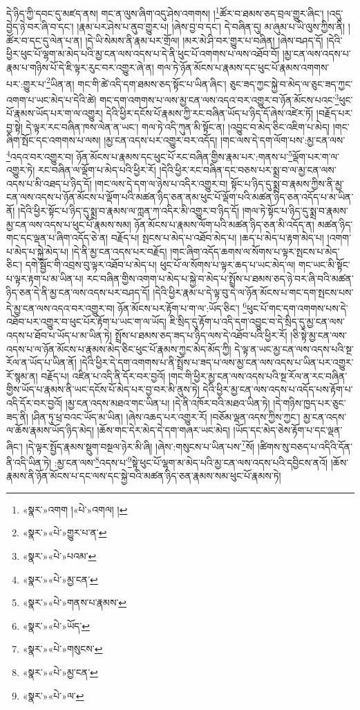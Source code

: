 དེ་ཉིད་ཀྱི་དབང་དུ་མཛད་ནས། གང་ན་ལུས་ཞིག་འདུ་ཤེས་འགགས། །\footnote{«སྣར་»འགག །«པེ་»འགལ། །}ཚོར་བ་ཐམས་ཅད་བྲལ་གྱུར་ཞིང་། །འདུ་བྱེད་ཉེ་བར་ཞི་བ་དང་། །རྣམ་པར་ཤེས་པ་ནུབ་གྱུར་པ། །ཞེས་བྱ་བ་དང་། དེ་བཞིན་དུ། མ་ཞུམ་པ་ཡི་ལུས་ཀྱིས་ནི། །ཚོར་བ་དང་དུ་ལེན་པ་ན། །དེ་ཡི་སེམས་ནི་རྣམ་པར་གྲོལ། །མར་མེ་ཤི་བར་གྱུར་པ་བཞིན། །ཞེས་བཤད་དོ། །དེའི་ཕྱིར་ཕུང་པོ་ལྷག་མ་མེད་པའི་མྱ་ངན་ལས་འདས་པ་དེ་ནི་ཕུང་པོ་འགགས་པ་ལས་འཐོབ་བོ། །མྱ་ངན་ལས་འདས་པ་རྣམ་པ་གཉིས་པོ་དེ་ཇི་ལྟར་རུང་བར་འགྱུར་ཞེ་ན། གལ་ཏེ་ཉོན་མོངས་པ་རྣམས་དང་ཕུང་པོ་རྣམས་འགགས་པར་:གྱུར་པ་\footnote{«སྣར་»«པེ་»གྱུར་པ་ན་}ཡིན་ན། གང་གི་ཚེ་འདི་དག་ཐམས་ཅད་སྟོང་པ་ཡིན་ཞིང་། ཅུང་ཟད་ཀྱང་སྐྱེ་བ་མེད་ལ་ཅུང་ཟད་ཀྱང་འགག་པ་ཡང་མེད་པ་དེའི་ཚེ། གང་དག་འགགས་པ་ལས་མྱ་ངན་ལས་འདའ་བར་འགྱུར་བ་ཉོན་མོངས་པའང་\footnote{«སྣར་»«པེ་»པའམ་}ཕུང་པོ་རྣམས་ཡོད་པར་ག་ལ་འགྱུར། དེའི་ཕྱིར་དངོས་པོ་རྣམས་ཀྱི་རང་བཞིན་ཡོད་པ་ཉིད་དོ་ཞེས་འཛེར་ཏོ། །བརྗོད་པར་བྱ་སྟེ། དེ་ལྟར་རང་བཞིན་ཁས་ལེན་ན་ཡང་། གལ་ཏེ་འདི་ཀུན་མི་སྟོང་ན། །འབྱུང་བ་མེད་ཅིང་འཇིག་པ་མེད། །གང་ཞིག་སྤོང་དང་འགགས་པ་ལས། །མྱ་ངན་འདས་པར་འགྱུར་བར་འདོད། །གང་ལས་དེ་དག་ལོག་པས་:མྱ་ངན་ལས་\footnote{«སྣར་»«པེ་»མྱ་ངན་}འདའ་བར་འགྱུར་བ། ཉོན་མོངས་པ་རྣམས་དང་ཕུང་པོ་རང་བཞིན་གྱིས་རྣམ་པར་:གནས་པ་\footnote{«སྣར་»«པེ་»གནས་པ་རྣམས་}ལྡོག་པར་ག་ལ་འགྱུར་ཏེ། རང་བཞིན་ལ་ལྡོག་པ་མེད་པའི་ཕྱིར་རོ། །དེའི་ཕྱིར་རང་བཞིན་དང་བཅས་པར་སྨྲ་བ་ལ་མྱ་ངན་ལས་འདས་པ་མི་འཐད་པ་ཉིད་དོ། །གང་ལས་དེ་དག་ལ་ཉེས་པ་འདིར་འགྱུར་བ། སྟོང་པ་ཉིད་དུ་སྨྲ་བ་རྣམས་ཀྱིས་ནི་མྱ་ངན་ལས་འདས་པ་ཉོན་མོངས་པ་ལྡོག་པའི་མཚན་ཉིད་ཅན་ནམ་ཕུང་པོ་ལྡོག་པའི་མཚན་ཉིད་ཅན་འདོད་པ་མ་ཡིན་ནོ། །དེའི་ཕྱིར་སྟོང་པ་ཉིད་དུ་སྨྲ་བ་རྣམས་ལ་ཀླན་ཀ་འདིར་མི་འགྱུར་བ་ཉིད་དོ། །གལ་ཏེ་སྟོང་པ་ཉིད་དུ་སྨྲ་བ་རྣམས་མྱ་ངན་ལས་འདས་པ་ཕུང་པོ་རྣམས་སམ། ཉོན་མོངས་པ་རྣམས་ལོག་པའི་མཚན་ཉིད་ཅན་མི་འདོད་ན། མཚན་ཉིད་གང་དང་ལྡན་པ་ཞིག་འདོད་ཅེ་ན། བརྗོད་པ། སྤངས་པ་མེད་པ་འཐོབ་མེད་པ། །ཆད་པ་མེད་པ་རྟག་མེད་པ། །འགག་པ་མེད་པ་སྐྱེ་མེད་པ། །དེ་ནི་མྱ་ངན་འདས་པར་བརྗོད། །གང་ཞིག་འདོད་ཆགས་ལ་སོགས་པ་ལྟར་སྤངས་པ་མེད་ཅིང་། དགེ་སྦྱོང་གི་འབྲས་བུ་ལྟར་འཐོབ་པ་མེད་པ། ཕུང་པོ་ལ་སོགས་པ་ལྟར་ཆད་པ་ཡང་མེད་ལ། གང་ཡང་མི་སྟོང་པ་ལྟར་རྟག་པ་མ་ཡིན་པ། རང་བཞིན་གྱིས་འགག་པ་མེད་པ་སྐྱེ་བ་མེད་པ་སྤྲོས་པ་ཐམས་ཅད་ཉེ་བར་ཞི་བའི་མཚན་ཉིད་ཅན་དེ་ནི་མྱ་ངན་ལས་འདས་པར་བཤད་དོ། །དེའི་ཕྱིར་རྣམ་པ་དེ་ལྟ་བུ་དེ་ལ་ཉོན་མོངས་པ་གང་དག་སྤངས་པས་དེ་མྱ་ངན་ལས་འདའ་བར་འགྱུར་བ། ཉོན་མོངས་པར་རྟོག་པ་ག་ལ་:ཡོད་ཅིང་། \footnote{«སྣར་»«པེ་»ཡོད་}ཕུང་པོ་གང་དག་འགགས་པས་དེ་འཐོབ་པར་འགྱུར་བ་ཕུང་པོར་རྟོག་པ་ཡང་ག་ལ་ཡོད། ཇི་སྲིད་དུ་རྟོག་པ་འདི་དག་འབྱུང་བ་དེ་སྲིད་དུ་མྱ་ངན་ལས་འདས་པ་ཐོབ་པ་ཡོད་པ་མ་ཡིན་ཏེ། སྤྲོས་པ་ཐམས་ཅད་ཟད་པ་ཉིད་ལས་དེ་འཐོབ་པའི་ཕྱིར་རོ། །ཅི་སྟེ་མྱ་ངན་ལས་འདས་པ་ལ་ཉོན་མོངས་པ་རྣམས་མེད་ཅིང་ཕུང་པོ་རྣམས་ཀྱང་མེད་མོད་ཀྱི། དེ་ལྟ་ན་ཡང་མྱ་ངན་ལས་འདས་པའི་སྔ་རོལ་ན་ཡོད་པ་ཡིན་ནོ། །དེའི་ཕྱིར་དེ་དག་འགགས་པ་ནི་སྤྲོས་པ་ཟད་པ་ལས་མྱ་ངན་ལས་འདས་པ་ཡིན་པར་འགྱུར་རོ་སྙམ་ན། བརྗོད་པ། འཛིན་པ་འདི་ནི་དོར་བར་བྱའོ། །གང་གི་ཕྱིར་མྱ་ངན་ལས་འདས་པའི་སྔ་རོལ་ན་རང་བཞིན་གྱིས་ཡོད་པ་རྣམས་ནི་ཡང་དངོས་པོ་མེད་པར་བྱ་བར་མི་ནུས་ཏེ། དེའི་ཕྱིར་མྱ་ངན་ལས་འདས་པ་འདོད་པས་རྟོག་པ་འདི་དོར་བར་བྱའོ། །མྱ་ངན་འདས་མཐའ་གང་ཡིན་པ། །དེ་ནི་འཁོར་བའི་མཐའ་ཡིན་ཏེ། །དེ་གཉིས་ཁྱད་པར་ཅུང་ཟད་ནི། །ཤིན་ཏུ་ཕྲ་བའང་ཡོད་མ་ཡིན། །ཞེས་འཆད་པར་འགྱུར་རོ། །བཅོམ་ལྡན་འདས་ཀྱིས་ཀྱང་། མྱ་ངན་འདས་ལ་ཆོས་རྣམས་ཡོད་ཉིད་མེད། །ཆོས་གང་དེར་མེད་དེ་དག་གཞར་ཡང་མེད། །ཡོད་དང་མེད་ཅེས་རྟོག་པ་དང་ལྡན་ཞིང་། །དེ་ལྟར་སྤྱོད་རྣམས་སྡུག་བསྔལ་ཉེར་མི་ཞི། །ཞེས་:གསུངས་པ་ཡིན་པས་\footnote{«སྣར་»«པེ་»གསུངས་}སོ། །ཚིགས་སུ་བཅད་པ་འདིའི་དོན་ནི་འདི་ཡིན་ཏེ། :མྱ་ངན་ལས་\footnote{«སྣར་»«པེ་»མྱ་ངན་}འདས་པ་\footnote{«སྣར་»«པེ་»ལ་}སྟེ་ཕུང་པོ་ལྷག་མ་མེད་པའི་མྱ་ངན་ལས་འདས་པའི་དབྱིངས་ནའོ། །ཆོས་རྣམས་ནི་ཉོན་མོངས་པ་དང་ལས་དང་སྐྱེ་བའི་མཚན་ཉིད་ཅན་རྣམས་སམ་ཕུང་པོ་རྣམས་ཏེ། 
